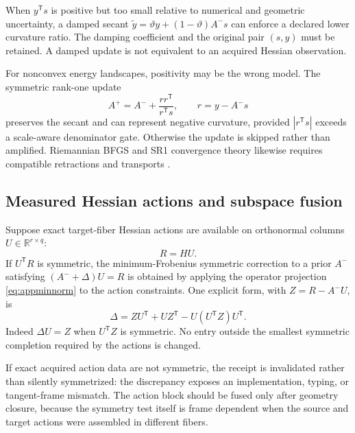 \documentclass[10pt,twocolumn]{article}
\theoremstyle{definition}
\theoremstyle{remark}
\newcommand{\R}{\mathbb R}
\begin{document}
When $y^{\mathsf T}s$ is positive but too small relative to numerical and
geometric uncertainty, a damped secant
$\widetilde y=\vartheta y+(1-\vartheta)A^-s$ can enforce a declared lower
curvature ratio.  The damping coefficient and the original pair $(s,y)$ must
be retained.  A damped update is not equivalent to an acquired Hessian
observation.

For nonconvex energy landscapes, positivity may be the wrong model.  The
symmetric rank-one update
\begin{equation}
 A^+=A^-+\frac{rr^{\mathsf T}}{r^{\mathsf T}s},
 \qquad r=y-A^-s
 \label{eq:appSR1}
\end{equation}
preserves the secant and can represent negative curvature, provided
$|r^{\mathsf T}s|$ exceeds a scale-aware denominator gate.  Otherwise the
update is skipped rather than amplified.  Riemannian BFGS and SR1 convergence
theory likewise requires compatible retractions and transports
\cite{Huang2015,Huang2018,HuangSR1}.

\subsection{Measured Hessian actions and subspace fusion}

Suppose exact target-fiber Hessian actions are available on orthonormal
columns $U\in\R^{r\times q}$:
\begin{equation}
 R=H U .
 \label{eq:appactions}
\end{equation}
If $U^{\mathsf T}R$ is symmetric, the minimum-Frobenius symmetric correction
to a prior $A^-$ satisfying $(A^-+\Delta)U=R$ is obtained by applying the
operator projection \eqref{eq:appminnorm} to the action constraints.  One
explicit form, with $Z=R-A^-U$, is
\begin{equation}
 \Delta=ZU^{\mathsf T}+UZ^{\mathsf T}
 -U(U^{\mathsf T}Z)U^{\mathsf T}.
 \label{eq:appactioncorrection}
\end{equation}
Indeed $\Delta U=Z$ when $U^{\mathsf T}Z$ is symmetric.  No entry outside the
smallest symmetric completion required by the actions is changed.

If exact acquired action data are not symmetric, the receipt is invalidated
rather than silently symmetrized: the discrepancy exposes an implementation,
typing, or tangent-frame mismatch.  The action block should be fused only
after geometry closure, because the symmetry test itself is frame dependent
when the source and target actions were assembled in different fibers.
\end{document}
